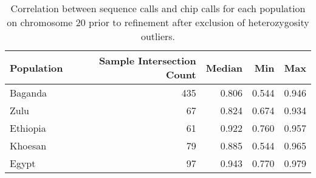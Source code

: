 \begin{table}[htbp]
\centering
\begin{tabular}{l|r|r|r|r}
\hline
Population & Sample Intersection Count & Median & Min & Max \\
\hline
Baganda & 435 & 0.806 & 0.544 & 0.946 \\
Zulu & 67 & 0.824 & 0.674 & 0.934 \\
Ethiopia & 61 & 0.922 & 0.760 & 0.957 \\
Khoesan & 79 & 0.885 & 0.544 & 0.965 \\
Egypt & 97 & 0.943 & 0.770 & 0.979 \\
\hline
\end{tabular}
\caption[Correlation between sequence calls and SNP array genotypes prior to refinement.]{Correlation between sequence calls and chip calls for each population on chromosome 20 prior to refinement after exclusion of heterozygosity outliers.}
\label{tab:correlation_prerefinement}
\end{table}